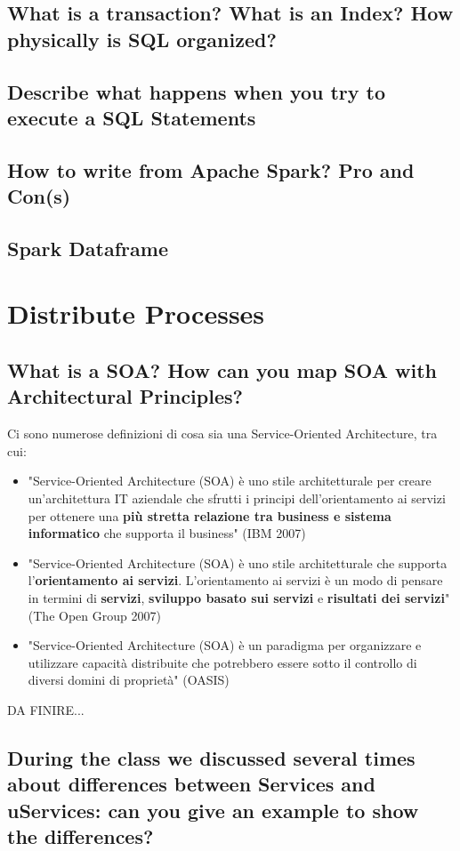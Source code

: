 \documentclass{article}
\begin{document}
\subsection{What is a transaction? What is an Index? How physically is SQL organized?}
\subsection{Describe what happens when you try to execute a SQL Statements}
\subsection{How to write from Apache Spark? Pro and Con(s)}
\subsection{Spark Dataframe}
\section{Distribute Processes}
\subsection{What is a SOA? How can you map SOA with Architectural Principles?}
Ci sono numerose definizioni di cosa sia una Service-Oriented Architecture, tra cui:
\begin{itemize}
    \item "Service-Oriented Architecture (SOA) è uno stile architetturale per creare un'architettura IT aziendale che sfrutti i principi dell'orientamento ai servizi per ottenere una \textbf{più stretta relazione tra business e sistema informatico} che supporta il business" (IBM 2007)
    \item "Service-Oriented Architecture (SOA) è uno stile architetturale che supporta l'\textbf{orientamento ai servizi}. L'orientamento ai servizi è un modo di pensare in termini di \textbf{servizi}, \textbf{sviluppo basato sui servizi} e \textbf{risultati dei servizi}" (The Open Group 2007)
    \item "Service-Oriented Architecture (SOA) è un paradigma per organizzare e utilizzare capacità distribuite che potrebbero essere sotto il controllo di diversi domini di proprietà" (OASIS)
\end{itemize}
DA FINIRE...

\subsection{During the class we discussed several times about differences between Services and uServices: can you give an example to show the differences?}
\end{document}
